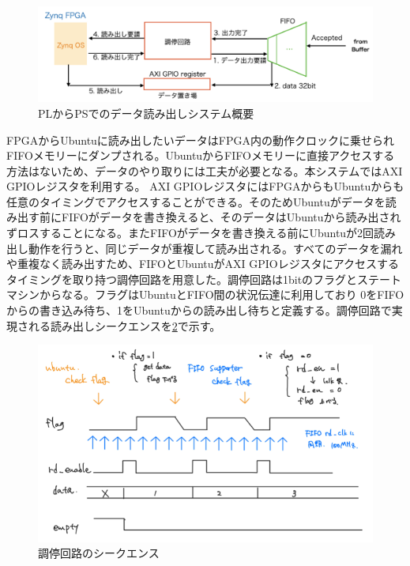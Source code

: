 \begin{figure} 
\centering
\includegraphics[width=16cm]{fig/QAQC/JATHubarbitator.png}
\caption[PLからPSでのデータ読み出しシステム概要]{PLからPSでのデータ読み出しシステム概要}
\label{JATHubarbitor}
\end{figure}

FPGAからUbuntuに読み出したいデータはFPGA内の動作クロックに乗せられFIFOメモリーにダンプされる。UbuntuからFIFOメモリーに直接アクセスする方法はないため、データのやり取りには工夫が必要となる。本システムではAXI GPIOレジスタを利用する。
AXI GPIOレジスタにはFPGAからもUbuntuからも任意のタイミングでアクセスすることができる。そのためUbuntuがデータを読み出す前にFIFOがデータを書き換えると、そのデータはUbuntuから読み出されずロスすることになる。またFIFOがデータを書き換える前にUbuntuが2回読み出し動作を行うと、同じデータが重複して読み出される。すべてのデータを漏れや重複なく読み出すため、FIFOとUbuntuがAXI GPIOレジスタにアクセスするタイミングを取り持つ調停回路を用意した。調停回路は1bitのフラグとステートマシンからなる。フラグはUbuntuとFIFO間の状況伝達に利用しており 0をFIFOからの書き込み待ち、1をUbuntuからの読み出し待ちと定義する。調停回路で実現される読み出しシークエンスを\ref{JATHubarbitation}で示す。
\begin{figure} 
\centering
\includegraphics[width=16cm]{fig/QAQC/JATHubarbitation.png}
\caption[調停回路のシークエンス]{調停回路のシークエンス}
\label{JATHubarbitation}
\end{figure}

